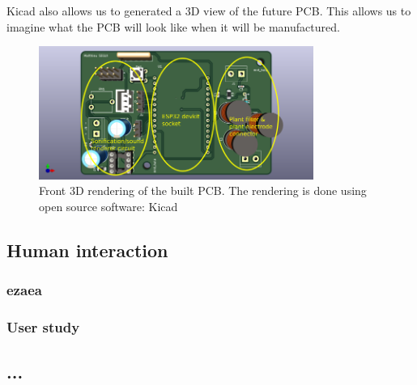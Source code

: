 Kicad also allows us to generated a 3D view of the future PCB. This allows us to imagine what the
PCB will look like when it will be manufactured.
\begin{figure}[h!]
    \centering
    \includegraphics[width=0.8\textwidth]{images/front_iop_3D_view_modified.png}
    \caption{Front 3D rendering of the built PCB. The rendering is done using open source software: Kicad} 
    \vspace{0.1cm}
    \label{fig:front_iop_3D_view_modified}
\end{figure}

\subsection{Human interaction}
\subsubsection{ezaea}
\newpage
\subsubsection{User study}

\subsection{...}